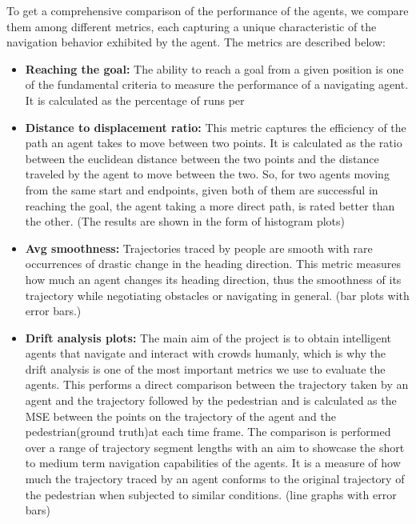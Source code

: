 To get a comprehensive comparison of the performance of the agents, we compare them among different metrics, each capturing a unique characteristic of the navigation behavior exhibited by the agent. The metrics are described below:
\begin{itemize}
        \item \textbf{Reaching the goal:} The ability to reach a goal from a given position is one of the fundamental criteria to measure the performance of a navigating agent. It is calculated as the percentage of runs per 
        \item \textbf{Distance to displacement ratio:} This metric captures the efficiency of the path an agent takes to move between two points. It is calculated as the ratio between the euclidean distance between the two points and the distance traveled by the agent to move between the two. So, for two agents moving from the same start and endpoints, given both of them are successful in reaching the goal, the agent taking a more direct path, is rated better than the other. (The results are shown in the form of histogram plots)
        \item \textbf{Avg smoothness:} Trajectories traced by people are smooth with rare occurrences of drastic change in the heading direction. This metric measures how much an agent changes its heading direction, thus the smoothness of its trajectory while negotiating obstacles or navigating in general. (bar plots with error bars.)
        \item \textbf{Drift analysis plots: }The main aim of the project is to obtain intelligent agents that navigate and interact with crowds humanly, which is why the drift analysis is one of the most important metrics we use to evaluate the agents. This performs a direct comparison between the trajectory taken by an agent and the trajectory followed by the pedestrian and is calculated as the MSE between the points on the trajectory of the agent and the pedestrian(ground truth)at each time frame. The comparison is performed over a range of trajectory segment lengths with an aim to showcase the short to medium term navigation capabilities of the agents. It is a measure of how much the trajectory traced by an agent conforms to the original trajectory of the pedestrian when subjected to similar conditions. (line graphs with error bars)\\

\end{itemize}
